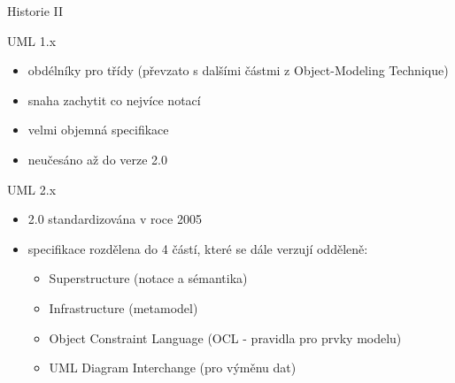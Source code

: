 \begin{frame}{Historie II}

\onslide<+->UML 1.x
\begin{itemize}[<+->]
    \item<+->obdélníky pro třídy (převzato s dalšími částmi z Object-Modeling 
             Technique)
    \item<+->snaha zachytit co nejvíce notací
    \item<+->velmi objemná specifikace
    \item<+->neučesáno až do verze 2.0
\end{itemize}  

\onslide<+->UML 2.x
\begin{itemize}[<+->]
    \item<+->2.0 standardizována v roce 2005
    \item<+->specifikace rozdělena do 4 částí, které se dále verzují odděleně:
    \begin{itemize}
        \item<+->Superstructure (notace a sémantika)
        \item<+->Infrastructure (metamodel)
        \item<+->Object Constraint Language (OCL - pravidla pro prvky modelu)
        \item<+->UML Diagram Interchange (pro výměnu dat)
    \end{itemize} 
    
\end{itemize}  


\end{frame}